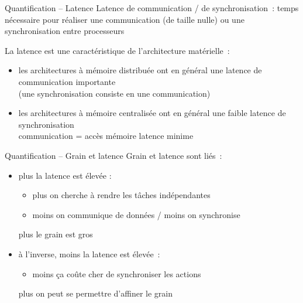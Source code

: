 \begin {frame} {Quantification -- Latence}
    Latence de communication / de synchronisation~: temps nécessaire pour
    réaliser une communication (de taille nulle) ou une synchronisation
    entre processeurs

    \vspace* {3mm}

    La latence est une caractéristique de l'architecture matérielle~:

    \begin {itemize}
	\item les architectures à mémoire distribuée ont en général
	    une latence de communication importante
	    \\
	    (une synchronisation consiste en une communication)

	\item les architectures à mémoire centralisée ont en général
	    une faible latence de synchronisation
	    \\
	    communication = accès mémoire \implique latence minime

    \end {itemize}

\end {frame}

\begin {frame} {Quantification -- Grain et latence}
    Grain et latence sont liés~:

    \begin {itemize}
	\item plus la latence est élevée :
	    \begin {itemize}
		\item plus on cherche à rendre les tâches indépendantes
		\item moins on communique de données / moins on synchronise
	    \end {itemize}
	    \implique plus le grain est gros

	\item à l'inverse, moins la latence est élevée~:

	    \begin {itemize}
		\item moins ça coûte cher de synchroniser les actions
	    \end {itemize}
	    \implique plus on peut se permettre d'affiner le grain

    \end {itemize}
\end {frame}

